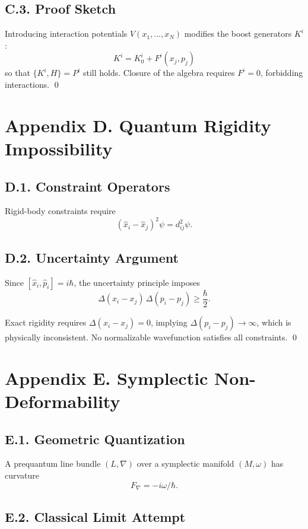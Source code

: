 \documentclass[12pt,oneside]{book}
\theoremstyle{plain}
\theoremstyle{definition}
\begin{document}
\subsection*{C.3. Proof Sketch}

Introducing interaction potentials $V(x_1,\dots,x_N)$ modifies the boost generators $K^i$:
\[
K^i = K_0^i + F^i(x_j,p_j)
\]
so that $\{K^i,H\} = P^i$ still holds. Closure of the algebra requires $F^i=0$, forbidding interactions. \qed

\section{Appendix D. Quantum Rigidity Impossibility}

\subsection*{D.1. Constraint Operators}

Rigid-body constraints require
\[
(\widehat{x}_i - \widehat{x}_j)^2 \psi = d_{ij}^2 \psi.
\]

\subsection*{D.2. Uncertainty Argument}

Since $[\widehat{x}_i,\widehat{p}_i] = i \hbar$, the uncertainty principle imposes
\[
\Delta(x_i - x_j) \, \Delta(p_i - p_j) \ge \frac{\hbar}{2}.
\]

Exact rigidity requires $\Delta(x_i - x_j) = 0$, implying $\Delta(p_i - p_j) \to \infty$, which is physically inconsistent. No normalizable wavefunction satisfies all constraints. \qed

\section{Appendix E. Symplectic Non-Deformability}

\subsection*{E.1. Geometric Quantization}

A prequantum line bundle $(L,\nabla)$ over a symplectic manifold $(M,\omega)$ has curvature
\[
F_\nabla = -i \omega / \hbar.
\]

\subsection*{E.2. Classical Limit Attempt}
\end{document}
